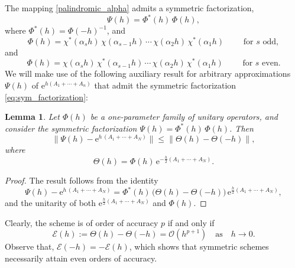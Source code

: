 \documentclass[11pt]{article}
\newcommand{\e}{\ensuremath{\mathrm{e}}}
\newtheorem{lemma}{Lemma}[section]
\begin{document}
The mapping \eqref{palindromic_alpha} admits a symmetric factorization,
\begin{equation} \label{eq:sym_factorization}
\Psi(h) = \Phi^*(h) \, \Phi(h),
\end{equation}
where
$\Phi^*(h) = \Phi(-h)^{-1}$, and
\begin{equation}
\label{eq:Phi_s_odd}
\Phi(h) = \chi^*(\alpha_{s} h) \, \chi(\alpha_{s-1} h) \, \cdots \, \chi(\alpha_2 h) \, \chi^*(\alpha_1 h) \qquad \mbox{ for $s$ odd}, 
\end{equation}
and
\begin{equation}
\label{eq:Phi_s_even}
\Phi(h) = \chi(\alpha_{s} h) \, \chi^*(\alpha_{s-1} h)  \, \cdots \, \chi(\alpha_2 h) \, \chi^*(\alpha_1 h) \qquad \mbox{ for $s$ even}. 
\end{equation}
We will make use of the following auxiliary result for arbitrary approximations $\Psi(h)$ of $\e^{h (A_1+\cdots+A_n)}$ that admit the symmetric factorization \eqref{eq:sym_factorization}:

\begin{lemma} \label{l:Theta}
Let  $\Phi(h)$ be a one-parameter family of unitary operators, and consider the symmetric factorization $\Psi(h) = \Phi^*(h) \, \Phi(h)$.
Then
\begin{equation*}
\|\Psi(h) - \e^{h\,  (A_1+\cdots+A_N)}\| \leq \| \Theta(h) - \Theta(-h)\|,
\end{equation*}
where
\begin{equation} \label{eq:Theta}
\Theta(h) = \Phi(h) \, \e^{-\frac{h}{2}  (A_1+\cdots+A_N)}.
\end{equation}
\end{lemma}
\begin{proof}
The result follows from the identity
\begin{equation*}
\Psi(h) - \e^{h\,  (A_1+\cdots+A_N)} = \Phi^*(h) \, \big(\Theta(h)-\Theta(-h) \big) \, \e^{\frac{h}{2} (A_1+\cdots+A_N) },
\end{equation*}
and the unitarity of both $\e^{\frac{h}{2} (A_1+\cdots+A_N) }$ and $\Phi(h)$.
\end{proof}
Clearly, the scheme is of order of accuracy $p$ if and only if 
\begin{equation} \label{order_p}
\mathcal{E}(h) := \Theta(h)-\Theta(-h) =  \mathcal{O}(h^{p+1}) \quad \mbox{as} \quad h \to 0. 
\end{equation}
Observe that, $\mathcal{E}(-h)=-\mathcal{E}(h)$, which shows  that symmetric schemes necessarily attain even orders of accuracy.
\end{document}
